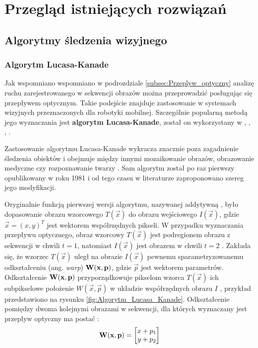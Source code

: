 \chapter{Przegląd istniejących rozwiązań}
\label{cha:Przeglad_istniejacych_rozwiazan}

\section{Algorytmy śledzenia wizyjnego}
\label{sec:Algorytmy_sledzenia_wizyjnego}

\subsection{Algorytm Lucasa-Kanade}
\label{subsec:Algorytm_Lucasa_Kanade}
Jak wspomniano wspomniano w podrozdziale \ref{subsec:Przeplyw_optyczny} analizę ruchu zarejestrowanego w sekwencji obrazów można przeprowadzić posługując się przepływem optycznym. Takie podejście znajduje zastosowanie w systemach wizyjnych przeznaczonych dla robotyki mobilnej. Szczególnie popularną metodą jego wyznaczania jest \textbf{algorytm Lucasa-Kanade}, został on wykorzystany w \cite{Markovic2014}, \cite{Sadeghi-Tehran2014}, \cite{Fernandez-Caballero2010}, \cite{Liem2008}.

Zastosowanie algorytmu Lucasa-Kanade wykracza znacznie poza zagadnienie śledzenia obiektów i obejmuje między innymi mozaikowanie obrazów, obrazowanie medyczne czy rozpoznawanie twarzy \cite{Baker2004}. Sam algorytm został po raz pierwszy opublikowany w roku 1981 i od tego czasu w literaturze zaproponowano szereg jego modyfikacji.

Oryginalnie funkcją pierwszej wersji algorytmu, nazywanej addytywną \cite{Baker2004}, było dopasowanie obrazu wzorcowego $T(\vec{x})$ do obrazu wejściowego $I(\vec{x})$, gdzie $\vec{x} = (x, y)^T$ jest wektorem współrzędnych pikseli. W przypadku wyznaczania przepływu optycznego, obraz wzorcowy $T(\vec{x})$ jest podregionem obrazu z sekwencji w chwili $t = 1$, natomiast $I(\vec{x})$ jest obrazem w chwili $t = 2$ \cite{Baker2004}. Zakłada się, że wzorzec $T(\vec{x})$ uległ na obrazie $I(\vec{x})$ pewnemu sparametryzowanemu odkształceniu (ang. \textit{warp}) $\mathbf{W}(\mathbf{x}, \mathbf{p})$, gdzie $\vec{p}$ jest wektorem parametrów. Odkształcenie $\mathbf{W}(\mathbf{x}, \mathbf{p})$ przyporządkowuje pikselom wzorca $T(\vec{x})$ ich subpikselowe położenie $W(\vec{x}, \vec{p})$ w układzie współrzędnych obrazu $I$  \cite{Baker2004}, przykład przedstawiono na rysunku \ref{fig:Algorytm_Lucasa_Kanade}. Odkształcenie pomiędzy dwoma kolejnymi obrazami w sekwencji, dla których wyznaczany jest przepływ optyczny ma postać \cite{Baker2004}:
\begin{equation}
\label{equ:Odksztalcenie_przeplyw_optyczny}
	\mathbf{W}(\mathbf{x}, \mathbf{p}) = \begin{bmatrix}
		x + p_1 \\
		y + p_2 \\
	\end{bmatrix}
\end{equation}

